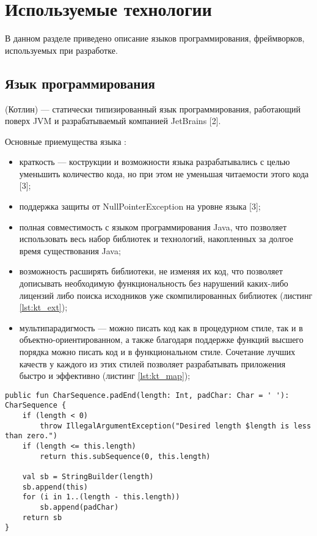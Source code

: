 \section{Используемые технологии}

В данном разделе приведено описание языков программирования, фреймворков,
используемых при разработке.

\subsection{Язык программирования \kt{}}
\label{sec:kotlin}

\kt{} (Котлин) --- статически типизированный язык программирования, работающий поверх 
JVM и разрабатываемый компанией JetBrains [2].

Основные приемущества языка \kt{}:
\begin{itemize}
  \item краткость --- кострукции и возможности языка разрабатывались с целью уменьшить 
  количество кода, но при этом не уменьшая читаемости этого кода [3];
  \item поддержка защиты от NullPointerException на уровне языка [3];
  \item полная совместимость с языком программирования Java, что позволяет использовать
  весь набор библиотек и технологий, накопленных за долгое время существования Java;
  \item возможность расширять библиотеки, не изменяя их код, что позволяет дописывать необходимую 
  функциональность без нарушений каких-либо лицензий либо поиска исходников уже 
  скомпилированных библиотек (листинг \ref{lst:kt_ext});
  \item мультипарадигмость --- \kt{} можно писать код как в процедурном стиле, так и в 
  объектно-ориентированном, а также благодаря поддержке функций высшего порядка можно 
  писать код и в функциональном стиле. Сочетание лучших качеств у каждого из этих стилей 
  позволяет разрабатывать приложения быстро и эффективно (листинг \ref{lst:kt_map});
\end{itemize} 

\begin{lstlisting}[style = ktstyle, 
           caption = {Пример Extension-функции на языке \kt{}},
           label = {lst:kt_ext}]
public fun CharSequence.padEnd(length: Int, padChar: Char = ' '): CharSequence {
    if (length < 0)
        throw IllegalArgumentException("Desired length $length is less than zero.")
    if (length <= this.length)
        return this.subSequence(0, this.length)

    val sb = StringBuilder(length)
    sb.append(this)
    for (i in 1..(length - this.length))
        sb.append(padChar)
    return sb
}
\end{lstlisting}


